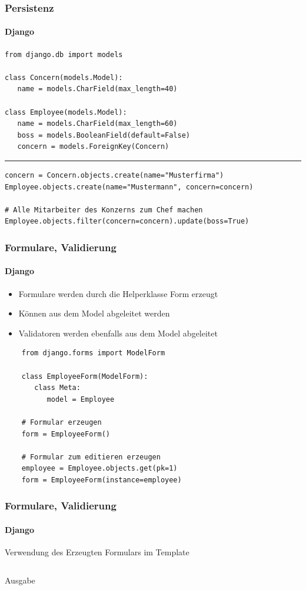 \documentclass[
    t,
    smaller,
    compress,
    xcolor=svgnames,            %
    table,
]{beamer}
\begin{document}
\begin{frame}[fragile]
  \frametitle{Persistenz}
  \framesubtitle{Django}

  \vspace{-8pt}
\begin{lstlisting}
from django.db import models

class Concern(models.Model):
   name = models.CharField(max_length=40)

class Employee(models.Model):
   name = models.CharField(max_length=60)
   boss = models.BooleanField(default=False)
   concern = models.ForeignKey(Concern)
\end{lstlisting}
\hrule
\begin{lstlisting}
concern = Concern.objects.create(name="Musterfirma")
Employee.objects.create(name="Mustermann", concern=concern)

# Alle Mitarbeiter des Konzerns zum Chef machen
Employee.objects.filter(concern=concern).update(boss=True)
\end{lstlisting}

\end{frame}

\begin{frame}[fragile]
  \frametitle{Formulare, Validierung}
  \framesubtitle{Django}
  \begin{itemize}[<1->]
     \item Formulare werden durch die Helperklasse Form erzeugt
     \item Können aus dem Model abgeleitet werden
     \item Validatoren werden ebenfalls aus dem Model abgeleitet
  \end{itemize}
  \begin{lstlisting}
    from django.forms import ModelForm

    class EmployeeForm(ModelForm):
       class Meta:
          model = Employee

    # Formular erzeugen
    form = EmployeeForm()

    # Formular zum editieren erzeugen
    employee = Employee.objects.get(pk=1)
    form = EmployeeForm(instance=employee)
  \end{lstlisting}

\end{frame}

\begin{frame}[fragile]
  \frametitle{Formulare, Validierung}

  \framesubtitle{Django}
  Verwendung des Erzeugten Formulars im Template
  \begin{lstlisting}

  \end{lstlisting}
  Ausgabe

\end{frame}
\end{document}
